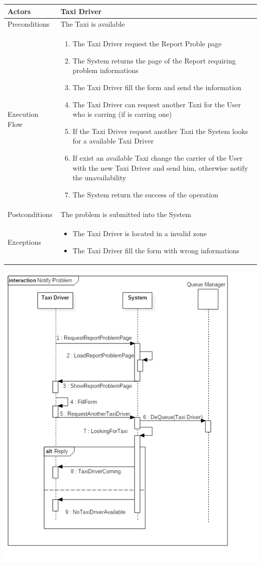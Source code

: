 \documentclass[english]{article}
\begin{document}
\begin{tabular}{lp{8cm}}
\hline
Actors & Taxi Driver \\
\hline
Preconditions & The Taxi is available\\
\hline
Execution Flow &  
		\begin{enumerate}
			\item The Taxi Driver request the Report Proble page
			\item The System returns the page of the Report requiring problem informations
			\item The Taxi Driver fill the form and send the information
			\item The Taxi Driver can request another Taxi for the User who is carring (if is carring one)
			\item If the Taxi Driver request another Taxi the System looks for a available Taxi Driver
			\item If exist an available Taxi change the carrier of the User with the new Taxi Driver and send him, otherwise notify the unavailability
			\item The System return the success of the operation
		\end{enumerate} 
	\\ 
\hline
Postconditions & The problem is submitted into the System \\
\hline
Exceptions & 
	\begin{itemize} 
		\item The Taxi Driver is located in a invalid zone
		\item The Taxi Driver fill the form with wrong informations
	\end{itemize}
\end{tabular}

\includegraphics[width=\textwidth]{NotifyProblem}
\end{document}

